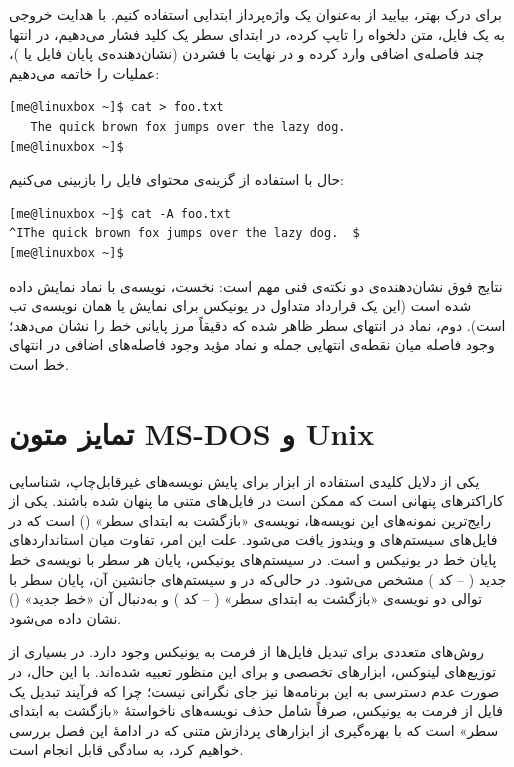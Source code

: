 برای درک بهتر، بیایید از  به‌عنوان یک واژه‌پرداز ابتدایی استفاده کنیم. با هدایت خروجی  به یک فایل، متن دلخواه را تایپ کرده، در ابتدای سطر یک کلید  فشار می‌دهیم، در انتها چند فاصله‌ی اضافی وارد کرده و در نهایت با فشردن  (نشان‌دهنده‌ی پایان فایل یا )، عملیات را خاتمه می‌دهیم:

\begin{latin}
\begin{lstlisting}
[me@linuxbox ~]$ cat > foo.txt
   The quick brown fox jumps over the lazy dog.
[me@linuxbox ~]$
\end{lstlisting}
\end{latin}

حال با استفاده از گزینه‌ی  محتوای فایل را بازبینی می‌کنیم:

\begin{latin}
\begin{lstlisting}
[me@linuxbox ~]$ cat -A foo.txt
^IThe quick brown fox jumps over the lazy dog.  $
[me@linuxbox ~]$
\end{lstlisting}
\end{latin}

نتایج فوق نشان‌دهنده‌ی دو نکته‌ی فنی مهم است: نخست، نویسه‌ی  با نماد  نمایش داده شده است (این یک قرارداد متداول در یونیکس برای نمایش  یا همان نویسه‌ی تب است). دوم، نماد \cmd{\$} در انتهای سطر ظاهر شده که دقیقاً مرز پایانی خط را نشان می‌دهد؛ وجود فاصله میان نقطه‌ی انتهایی جمله و نماد \cmd{\$} مؤید وجود فاصله‌های اضافی در انتهای خط است.

\section{تمایز متون MS-DOS و Unix}

یکی از دلایل کلیدی استفاده از ابزار  برای پایش نویسه‌های غیرقابل‌چاپ، شناسایی کاراکترهای پنهانی است که ممکن است در فایل‌های متنی ما پنهان شده باشند. یکی از رایج‌ترین نمونه‌های این نویسه‌ها، نویسه‌ی «بازگشت به ابتدای سطر» () است که در فایل‌های سیستم‌های  و ویندوز یافت می‌شود. علت این امر، تفاوت میان استانداردهای پایان خط در یونیکس و  است. در سیستم‌های یونیکس، پایان هر سطر با نویسه‌ی خط جدید ( – کد ) مشخص می‌شود. در حالی‌که در  و سیستم‌های جانشین آن، پایان سطر با توالی دو نویسه‌ی «بازگشت به ابتدای سطر» ( – کد ) و به‌دنبال آن «خط جدید» () نشان داده می‌شود.

روش‌های متعددی برای تبدیل فایل‌ها از فرمت  به یونیکس وجود دارد. در بسیاری از توزیع‌های لینوکس، ابزارهای تخصصی  و  برای این منظور تعبیه شده‌اند. با این حال، در صورت عدم دسترسی به این برنامه‌ها نیز جای نگرانی نیست؛ چرا که فرآیند تبدیل یک فایل از فرمت  به یونیکس، صرفاً شامل حذف نویسه‌های ناخواستهٔ «بازگشت به ابتدای سطر» است که با بهره‌گیری از ابزارهای پردازش متنی که در ادامهٔ این فصل بررسی خواهیم کرد، به سادگی قابل انجام است.

